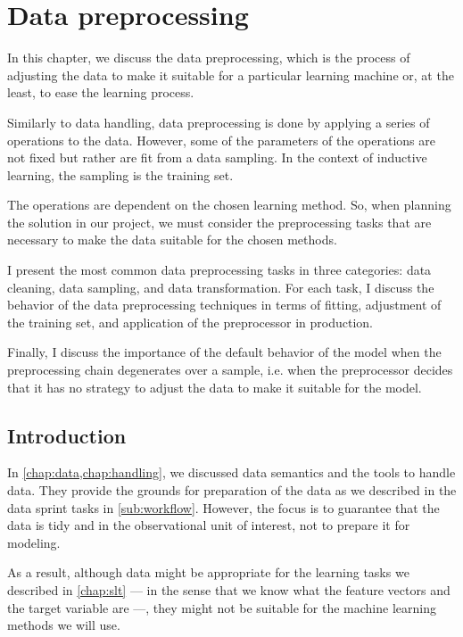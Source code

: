 \chapter{Data preprocessing}
\label{chap:preprocess}

In this chapter, we discuss the data preprocessing, which is the process of adjusting the
data to make it suitable for a particular learning machine or, at the least, to ease the
learning process.

Similarly to data handling, data preprocessing is done by applying a series of operations
to the data.  However, some of the parameters of the operations are not fixed but rather
are fit from a data sampling.  In the context of inductive learning, the sampling is the
training set.

The operations are dependent on the chosen learning method.  So, when planning the
solution in our project, we must consider the preprocessing tasks that are necessary to
make the data suitable for the chosen methods.

I present the most common data preprocessing tasks in three categories: data cleaning,
data sampling, and data transformation.  For each task, I discuss the behavior of the data
preprocessing techniques in terms of fitting, adjustment of the training set, and
application of the preprocessor in production.

Finally, I discuss the importance of the default behavior of the model when the
preprocessing chain degenerates over a sample, i.e. when the preprocessor decides that it
has no strategy to adjust the data to make it suitable for the model.

\section{Introduction}

In \cref{chap:data,chap:handling}, we discussed data semantics and the tools to
handle data.  They provide the grounds for preparation of the data as we described in the
data sprint tasks in \cref{sub:workflow}.  However, the focus is to guarantee that the
data is tidy and in the observational unit of interest, not to prepare it for modeling.

As a result, although data might be appropriate for the learning tasks we described in
\cref{chap:slt} --- in the sense that we know what the feature vectors and the target
variable are ---, they might not be suitable for the machine learning methods we will use.


